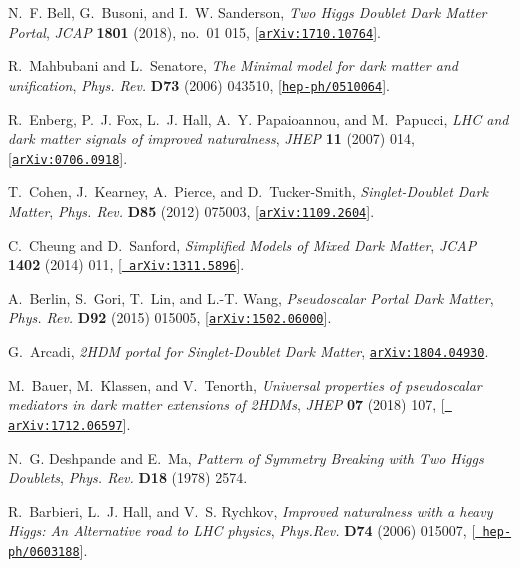 \documentclass[a4paper, 11pt,notoc]{article}
\begin{document}
\begin{thebibliography}{100}
N.~F. Bell, G.~Busoni, and I.~W. Sanderson, {\it {Two Higgs Doublet Dark Matter
  Portal}},  {\em JCAP} {\bf 1801} (2018), no.~01 015,
  [\href{http://arxiv.org/abs/1710.10764}{{\tt arXiv:1710.10764}}].

R.~Mahbubani and L.~Senatore, {\it {The Minimal model for dark matter and
  unification}},  {\em Phys. Rev.} {\bf D73} (2006) 043510,
  [\href{http://arxiv.org/abs/hep-ph/0510064}{{\tt hep-ph/0510064}}].

R.~Enberg, P.~J. Fox, L.~J. Hall, A.~Y. Papaioannou, and M.~Papucci, {\it {LHC
  and dark matter signals of improved naturalness}},  {\em JHEP} {\bf 11}
  (2007) 014, [\href{http://arxiv.org/abs/0706.0918}{{\tt arXiv:0706.0918}}].

T.~Cohen, J.~Kearney, A.~Pierce, and D.~Tucker-Smith, {\it {Singlet-Doublet
  Dark Matter}},  {\em Phys. Rev.} {\bf D85} (2012) 075003,
  [\href{http://arxiv.org/abs/1109.2604}{{\tt arXiv:1109.2604}}].

C.~Cheung and D.~Sanford, {\it {Simplified Models of Mixed Dark Matter}},  {\em
  JCAP} {\bf 1402} (2014) 011, [\href{http://arxiv.org/abs/1311.5896}{{\tt
  arXiv:1311.5896}}].

A.~Berlin, S.~Gori, T.~Lin, and L.-T. Wang, {\it {Pseudoscalar Portal Dark
  Matter}},  {\em Phys. Rev.} {\bf D92} (2015) 015005,
  [\href{http://arxiv.org/abs/1502.06000}{{\tt arXiv:1502.06000}}].

G.~Arcadi, {\it {2HDM portal for Singlet-Doublet Dark Matter}},
  \href{http://arxiv.org/abs/1804.04930}{{\tt arXiv:1804.04930}}.

M.~Bauer, M.~Klassen, and V.~Tenorth, {\it {Universal properties of
  pseudoscalar mediators in dark matter extensions of 2HDMs}},  {\em JHEP} {\bf
  07} (2018) 107, [\href{http://arxiv.org/abs/1712.06597}{{\tt
  arXiv:1712.06597}}].

N.~G. Deshpande and E.~Ma, {\it {Pattern of Symmetry Breaking with Two Higgs
  Doublets}},  {\em Phys. Rev.} {\bf D18} (1978) 2574.

R.~Barbieri, L.~J. Hall, and V.~S. Rychkov, {\it {Improved naturalness with a
  heavy Higgs: An Alternative road to LHC physics}},  {\em Phys.Rev.} {\bf D74}
  (2006) 015007, [\href{http://arxiv.org/abs/hep-ph/0603188}{{\tt
  hep-ph/0603188}}].


\end{thebibliography}
\end{document}
